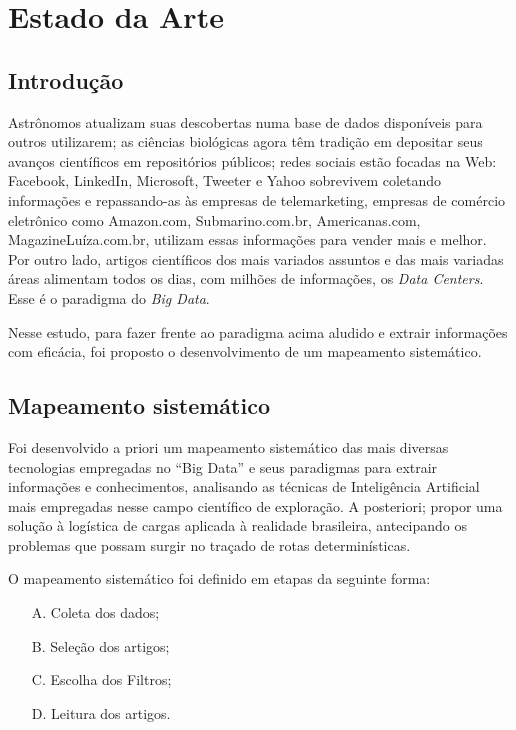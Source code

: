 \chapter{Estado da Arte}\label{arte}

\section{Introdução}\label{arte:intro}

Astrônomos atualizam suas descobertas numa base de dados disponíveis para outros utilizarem; as ciências biológicas agora têm tradição 
em depositar seus avanços científicos em repositórios públicos; redes sociais estão focadas na Web: Facebook, LinkedIn, Microsoft, 
Tweeter e Yahoo sobrevivem coletando informações e repassando-as às empresas de telemarketing, empresas de comércio eletrônico como 
Amazon.com, Submarino.com.br, Americanas.com, MagazineLuíza.com.br, utilizam essas informações para vender mais e melhor. 
Por outro lado, artigos científicos dos mais variados assuntos e das mais variadas áreas alimentam todos os dias, com milhões de 
informações, os \textit{Data Centers}. Esse é o paradigma do \textit{Big Data}.

Nesse estudo, para fazer frente ao paradigma acima aludido e extrair informações com eficácia, 
foi proposto o desenvolvimento de um mapeamento sistemático.

\section{Mapeamento sistemático}

Foi desenvolvido a priori um mapeamento sistemático das mais diversas tecnologias empregadas no ``Big Data'' e seus paradigmas para extrair informações e conhecimentos, 
analisando as técnicas de Inteligência Artificial mais empregadas nesse campo científico de exploração.
A posteriori; propor uma solução à logística de cargas aplicada à realidade brasileira, antecipando os problemas que possam surgir no traçado de rotas determinísticas. 

O mapeamento sistemático foi definido em etapas da seguinte forma:

\begin{enumerate}
 \item[A.] Coleta dos dados;
 \item[B.] Seleção dos artigos; 
 \item[C.] Escolha dos Filtros;
 \item[D.] Leitura dos artigos.
\end{enumerate}


